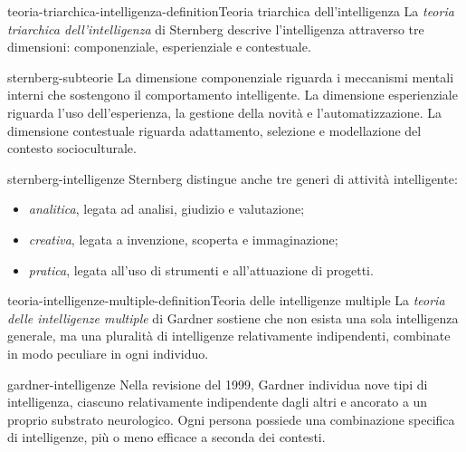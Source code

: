 \documentclass[preview]{standalone}
\begin{document}

\begin{snippetdefinition}{teoria-triarchica-intelligenza-definition}{Teoria triarchica dell'intelligenza}
    La \emph{teoria triarchica dell'intelligenza} di Sternberg descrive
    l'intelligenza attraverso tre dimensioni: componenziale, esperienziale e
    contestuale.
\end{snippetdefinition}

\begin{snippet}{sternberg-subteorie}
    La dimensione componenziale riguarda i meccanismi mentali interni che
    sostengono il comportamento intelligente. La dimensione esperienziale
    riguarda l'uso dell'esperienza, la gestione della novità e
    l'automatizzazione. La dimensione contestuale riguarda adattamento, selezione
    e modellazione del contesto socioculturale.
\end{snippet}

\begin{snippet}{sternberg-intelligenze}
    Sternberg distingue anche tre generi di attività intelligente:
    \begin{itemize}
        \item \emph{analitica}, legata ad analisi, giudizio e valutazione;
        \item \emph{creativa}, legata a invenzione, scoperta e immaginazione;
        \item \emph{pratica}, legata all'uso di strumenti e all'attuazione di
        progetti.
    \end{itemize}
\end{snippet}


\begin{snippetdefinition}{teoria-intelligenze-multiple-definition}{Teoria delle intelligenze multiple}
    La \emph{teoria delle intelligenze multiple} di Gardner sostiene che non
    esista una sola intelligenza generale, ma una pluralità di intelligenze
    relativamente indipendenti, combinate in modo peculiare in ogni individuo.
\end{snippetdefinition}

\begin{snippet}{gardner-intelligenze}
    Nella revisione del 1999, Gardner individua nove tipi di intelligenza,
    ciascuno relativamente indipendente dagli altri e ancorato a un proprio
    substrato neurologico. Ogni persona possiede una combinazione specifica di
    intelligenze, più o meno efficace a seconda dei contesti.
\end{snippet}
\end{document}
